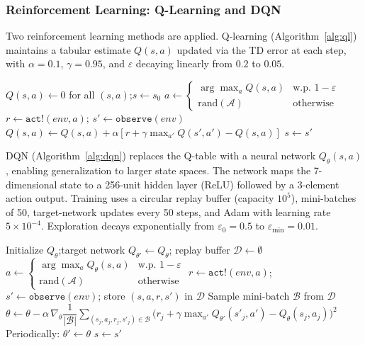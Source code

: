 \documentclass[conference]{IEEEtran}
\begin{document}
\subsubsection{Reinforcement Learning: Q-Learning and DQN}

Two reinforcement learning methods are applied. Q-learning (Algorithm~\ref{alg:ql})
maintains a tabular estimate $Q(s,a)$ updated via the TD error at each step, with
$\alpha = 0.1$, $\gamma = 0.95$, and $\varepsilon$ decaying linearly from $0.2$ to
$0.05$.

\begin{algorithm}
\caption{Q-Learning \cite{kochenderfer2022algorithms}}
\label{alg:ql}
\begin{algorithmic}[1]
\State $Q(s,a) \gets 0$ for all $(s,a)$;\quad $s \gets s_0$
\Loop
  \State $a \gets \begin{cases}
      \arg\max_{a} Q(s,a) & \text{w.p. } 1-\varepsilon \\
      \mathrm{rand}(\mathcal{A}) & \text{otherwise}
    \end{cases}$
  \State $r \gets \texttt{act!}(\textit{env}, a)$;\quad
         $s' \gets \texttt{observe}(\textit{env})$
  \State $Q(s,a) \gets Q(s,a) + \alpha\!\left[r + \gamma\max_{a'}Q(s',a') - Q(s,a)\right]$
  \State $s \gets s'$
\EndLoop
\end{algorithmic}
\end{algorithm}

DQN (Algorithm~\ref{alg:dqn}) replaces the Q-table with a neural network
$Q_\theta(s,a)$, enabling generalization to larger state spaces. The network maps the
7-dimensional state to a 256-unit hidden layer (ReLU) followed by a 3-element action
output. Training uses a circular replay buffer (capacity $10^5$), mini-batches of 50,
target-network updates every 50 steps, and Adam with learning rate $5\times10^{-4}$.
Exploration decays exponentially from $\varepsilon_0 = 0.5$ to $\varepsilon_{\min} =
0.01$.

\begin{algorithm}
\caption{Deep Q-Network (DQN)}
\label{alg:dqn}
\begin{algorithmic}[1]
\State Initialize $Q_\theta$;\quad target network $Q_{\theta'} \gets Q_\theta$;\quad
       replay buffer $\mathcal{D} \gets \emptyset$
\Loop
  \State $a \gets \begin{cases}
      \arg\max_{a} Q_\theta(s,a) & \text{w.p. } 1-\varepsilon \\
      \mathrm{rand}(\mathcal{A}) & \text{otherwise}
    \end{cases}$
  \State $r \gets \texttt{act!}(\textit{env},a)$;\quad
         $s' \gets \texttt{observe}(\textit{env})$;\quad
         store $(s,a,r,s')$ in $\mathcal{D}$
  \State Sample mini-batch $\mathcal{B}$ from $\mathcal{D}$
  \State $\theta \gets \theta - \alpha\,\nabla_\theta
    \dfrac{1}{|\mathcal{B}|}\!\sum_{(s_j,a_j,r_j,s'_j)\in\mathcal{B}}
    \!\!\bigl(r_j + \gamma\max_{a'}Q_{\theta'}(s'_j,a') - Q_\theta(s_j,a_j)\bigr)^{\!2}$
  \State Periodically: $\theta' \gets \theta$ 
  \State $s \gets s'$
\EndLoop
\end{algorithmic}
\end{algorithm}
\end{document}
